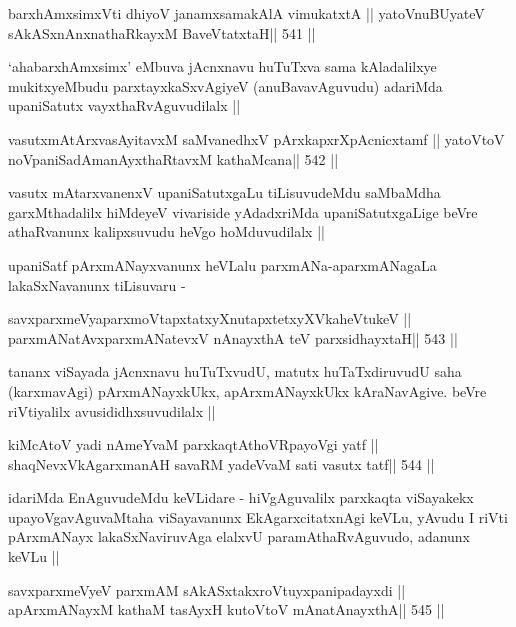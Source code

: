 \begin{shl}
barxhAmxsimxVti dhiyoV janamxsamakAlA vimukatxtA ||
yatoV\s nuBUyateV sAkASxnAnxnathaRkayxM BaveVtatxtaH\hfill || 541 ||
\end{shl}

\begin{artha}
`ahabarxhAmxsimx' eMbuva jAcnxnavu huTuTxva sama kAladalilxye
  mukitxyeMbudu parxtayxkaSxvAgiyeV (anuBavavAguvudu) adariMda
  upaniSatutx vayxthaRvAguvudilalx ||
\end{artha}

\begin{shl}
vasutxmAtArxvasAyitavxM saMvanedhxV pArxkapxrXpAcnicxtamf ||
yatoV\s toV noVpaniSadAmanAyxthaRtavxM kathaMcana\hfill || 542 ||
\end{shl}

\begin{artha}
vasutx mAtarxvanenxV upaniSatutxgaLu tiLisuvudeMdu saMbaMdha
garxMthadalilx hiMdeyeV vivariside yAdadxriMda upaniSatutxgaLige beVre
athaRvanunx kalipxsuvudu heVgo hoMduvudilalx ||

upaniSatf pArxmANayxvanunx heVLalu parxmANa-aparxmANagaLa
lakaSxNavanunx tiLisuvaru -
\end{artha}

\begin{shl}
savxparxmeVyaparxmoVtapxtatxyXnutapxtetxyXVkaheVtukeV ||
parxmANatAvxparxmANatevxV nAnayxthA teV parxsidhayxtaH\hfill || 543 ||
\end{shl}

\begin{artha}
tananx viSayada jAcnxnavu huTuTxvudU, matutx huTaTxdiruvudU saha
(karxmavAgi) pArxmANayxkUkx, apArxmANayxkUkx kAraNavAgive. beVre
riVtiyalilx avusididhxsuvudilalx ||
\end{artha}

\begin{shl}
kiMcAtoV yadi nAmeYvaM parxkaqtAthoVRpayoVgi yatf ||
shaqNevxVkAgarxmanAH savaRM yadeVvaM sati vasutx tatf\hfill || 544 ||
\end{shl}

\begin{artha}
idariMda EnAguvudeMdu keVLidare - hiVgAguvalilx parxkaqta viSayakekx
upayoVgavAguvaMtaha viSayavanunx EkAgarxcitatxnAgi keVLu, yAvudu I
riVti pArxmANayx lakaSxNaviruvAga elalxvU paramAthaRvAguvudo, adanunx
keVLu ||
\end{artha}

\begin{shl}
savxparxmeVyeV parxmAM sAkASxtakxroVtuyxpanipadayxdi ||
apArxmANayxM kathaM tasAyxH kutoV\s toV mAnatA\s nayxthA\hfill || 545 ||
\end{shl}


